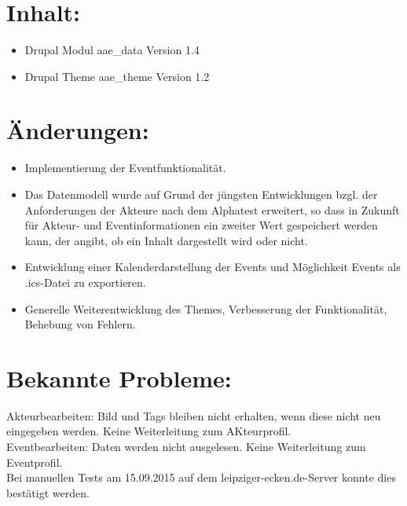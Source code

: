 \documentclass{swp}
\begin{document}
\\\\\\\\\\

\section{Inhalt:}
\begin{itemize} 
\item Drupal Modul \glqq aae\_{}data\grqq{} Version 1.4
\item Drupal Theme \glqq aae\_{}theme\grqq{} Version 1.2
\end{itemize}
\section{\"Anderungen:}
\begin{itemize} 
\item Implementierung der Eventfunktionalit\"at.
\item Das Datenmodell wurde auf Grund der j\"ungsten Entwicklungen bzgl. der Anforderungen der Akteure nach dem Alphatest erweitert, so dass in Zukunft f\"ur Akteur- und Eventinformationen ein zweiter Wert gespeichert werden kann, der angibt, ob ein Inhalt dargestellt wird oder nicht.
\item Entwicklung einer Kalenderdarstellung der Events und M\"oglichkeit Events als .ics-Datei zu exportieren.
\item Generelle Weiterentwicklung des Themes, Verbesserung der Funktionalit\"at, Behebung von Fehlern.
\end{itemize}
\section{Bekannte Probleme:}
Akteurbearbeiten: Bild und Tags bleiben nicht erhalten, wenn diese nicht neu eingegeben werden. Keine Weiterleitung zum AKteurprofil.\\
Eventbearbeiten: Daten werden nicht ausgelesen. Keine Weiterleitung zum Eventprofil.\\
Bei manuellen Tests am 15.09.2015 auf dem leipziger-ecken.de-Server konnte dies best\"atigt werden.
\end{document}

